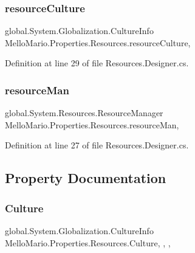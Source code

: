\subsubsection{resource\+Culture}
{\footnotesize\ttfamily global.\+System.\+Globalization.\+Culture\+Info Mello\+Mario.\+Properties.\+Resources.\+resource\+Culture\hspace{0.3cm}{\ttfamily [static]}, {\ttfamily [private]}}



Definition at line 29 of file Resources.\+Designer.\+cs.

\mbox{\label{classMelloMario_1_1Properties_1_1Resources_a979f48abc5b344a61f7e2245cd90032e}} 
\subsubsection{resource\+Man}
{\footnotesize\ttfamily global.\+System.\+Resources.\+Resource\+Manager Mello\+Mario.\+Properties.\+Resources.\+resource\+Man\hspace{0.3cm}{\ttfamily [static]}, {\ttfamily [private]}}



Definition at line 27 of file Resources.\+Designer.\+cs.



\subsection{Property Documentation}
\mbox{\label{classMelloMario_1_1Properties_1_1Resources_ac107c238e8be754b92e9f028017c5573}} 
\subsubsection{Culture}
{\footnotesize\ttfamily global.\+System.\+Globalization.\+Culture\+Info Mello\+Mario.\+Properties.\+Resources.\+Culture\hspace{0.3cm}{\ttfamily [static]}, {\ttfamily [get]}, {\ttfamily [set]}, {\ttfamily [package]}}



